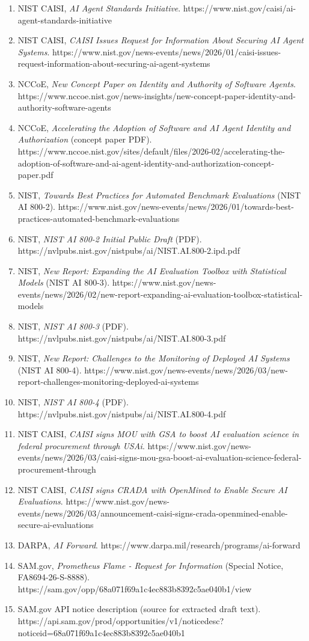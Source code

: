 \documentclass[11pt]{article}
\begin{document}
\begin{enumerate}
\def\labelenumi{\arabic{enumi}.}
\tightlist
\item
  NIST CAISI, \emph{AI Agent Standards Initiative}.
  https://www.nist.gov/caisi/ai-agent-standards-initiative
\item
  NIST CAISI, \emph{CAISI Issues Request for Information About Securing
  AI Agent Systems}.
  https://www.nist.gov/news-events/news/2026/01/caisi-issues-request-information-about-securing-ai-agent-systems
\item
  NCCoE, \emph{New Concept Paper on Identity and Authority of Software
  Agents}.
  https://www.nccoe.nist.gov/news-insights/new-concept-paper-identity-and-authority-software-agents
\item
  NCCoE, \emph{Accelerating the Adoption of Software and AI Agent
  Identity and Authorization} (concept paper PDF).
  https://www.nccoe.nist.gov/sites/default/files/2026-02/accelerating-the-adoption-of-software-and-ai-agent-identity-and-authorization-concept-paper.pdf
\item
  NIST, \emph{Towards Best Practices for Automated Benchmark
  Evaluations} (NIST AI 800-2).
  https://www.nist.gov/news-events/news/2026/01/towards-best-practices-automated-benchmark-evaluations
\item
  NIST, \emph{NIST AI 800-2 Initial Public Draft} (PDF).
  https://nvlpubs.nist.gov/nistpubs/ai/NIST.AI.800-2.ipd.pdf
\item
  NIST, \emph{New Report: Expanding the AI Evaluation Toolbox with
  Statistical Models} (NIST AI 800-3).
  https://www.nist.gov/news-events/news/2026/02/new-report-expanding-ai-evaluation-toolbox-statistical-models
\item
  NIST, \emph{NIST AI 800-3} (PDF).
  https://nvlpubs.nist.gov/nistpubs/ai/NIST.AI.800-3.pdf
\item
  NIST, \emph{New Report: Challenges to the Monitoring of Deployed AI
  Systems} (NIST AI 800-4).
  https://www.nist.gov/news-events/news/2026/03/new-report-challenges-monitoring-deployed-ai-systems
\item
  NIST, \emph{NIST AI 800-4} (PDF).
  https://nvlpubs.nist.gov/nistpubs/ai/NIST.AI.800-4.pdf
\item
  NIST CAISI, \emph{CAISI signs MOU with GSA to boost AI evaluation
  science in federal procurement through USAi}.
  https://www.nist.gov/news-events/news/2026/03/caisi-signs-mou-gsa-boost-ai-evaluation-science-federal-procurement-through
\item
  NIST CAISI, \emph{CAISI signs CRADA with OpenMined to Enable Secure AI
  Evaluations}.
  https://www.nist.gov/news-events/news/2026/03/announcement-caisi-signs-crada-openmined-enable-secure-ai-evaluations
\item
  DARPA, \emph{AI Forward}.
  https://www.darpa.mil/research/programs/ai-forward
\item
  SAM.gov, \emph{Prometheus Flame - Request for Information} (Special
  Notice, FA8694-26-S-8888).
  https://sam.gov/opp/68a071f69a1c4ec883b8392c5ae040b1/view
\item
  SAM.gov API notice description (source for extracted draft text).
  https://api.sam.gov/prod/opportunities/v1/noticedesc?noticeid=68a071f69a1c4ec883b8392c5ae040b1
\end{enumerate}
\end{document}

